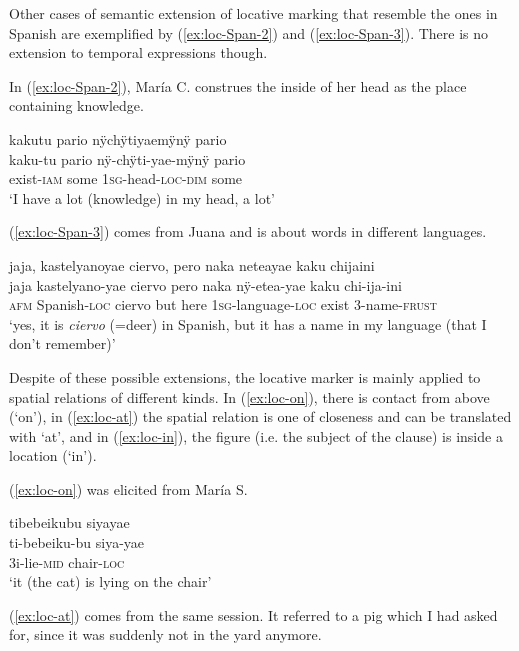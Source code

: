 Other cases of semantic extension of locative marking that resemble the ones in Spanish are exemplified by (\ref{ex:loc-Span-2}) and (\ref{ex:loc-Span-3}). There is no extension to temporal expressions though.

In (\ref{ex:loc-Span-2}), María C. construes the inside of her head as the place containing knowledge.

\ea\label{ex:loc-Span-2}
\begingl
\glpreamble kakutu pario nÿchÿtiyaemÿnÿ pario\\
\gla kaku-tu pario nÿ-chÿti-yae-mÿnÿ pario\\
\glb exist-\textsc{iam} some 1\textsc{sg}-head-\textsc{loc}-\textsc{dim} some\\
\glft ‘I have a lot (knowledge) in my head, a lot’
\endgl
\trailingcitation{[uxx-p110825l.095]}
\xe

(\ref{ex:loc-Span-3}) comes from Juana and is about words in different languages.

\ea\label{ex:loc-Span-3}
\begingl
\glpreamble jaja, kastelyanoyae ciervo, pero naka neteayae kaku chijaini\\
\gla jaja kastelyano-yae ciervo pero naka nÿ-etea-yae kaku chi-ija-ini\\
\glb \textsc{afm} Spanish-\textsc{loc} ciervo but here 1\textsc{sg}-language-\textsc{loc} exist 3-name-\textsc{frust}\\
\glft ‘yes, it is \textit{ciervo} (=deer) in Spanish, but it has a name in my language (that I don’t remember)’
\endgl
\trailingcitation{[jxx-a120516l-a.231-233]}
\xe

Despite of these possible extensions, the locative marker is mainly applied to spatial relations of different kinds. In (\ref{ex:loc-on}), there is contact from above (‘on’), in (\ref{ex:loc-at}) the spatial relation is one of closeness and can be translated with ‘at’, and in (\ref{ex:loc-in}), the figure (i.e. the subject of the clause) is inside a location (‘in’).

(\ref{ex:loc-on}) was elicited from María S.

\ea\label{ex:loc-on}
\begingl
\glpreamble tibebeikubu siyayae\\
\gla ti-bebeiku-bu siya-yae\\
\glb 3i-lie-\textsc{mid} chair-\textsc{loc}\\
\glft ‘it (the cat) is lying on the chair’
\endgl
\trailingcitation{[rxx-e181024l]}%
\xe

(\ref{ex:loc-at}) comes from the same session. It referred to a pig which I had asked for, since it was suddenly not in the yard anymore.

